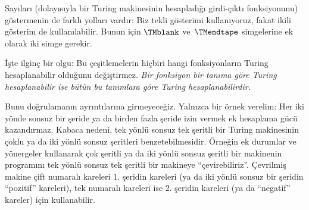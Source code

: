 Sayıları (dolayısıyla bir Turing makinesinin hesapladığı girdi-çıktı
fonksiyonunu) göstermenin de farklı yolları vardır: Biz tekli gösterimi
kullanıyoruz, fakat ikili gösterim de kullanılabilir. Bunun için $\TMblank$
ve~$\TMendtape$ simgelerine ek olarak iki simge gerekir.

İşte ilginç bir olgu: Bu çeşitlemelerin hiçbiri hangi fonksiyonların Turing
hesaplanabilir olduğunu değiştirmez. \emph{Bir fonksiyon bir tanıma göre
Turing hesaplanabilir ise bütün bu tanımlara göre Turing hesaplanabilirdir.}

Bunu doğrulamanın ayrıntılarına girmeyeceğiz. Yalnızca bir örnek verelim:
Her iki yönde sonsuz bir şeride ya da birden fazla şeride izin vermek ek
hesaplama gücü kazandırmaz. Kabaca nedeni, tek yönlü sonsuz tek şeritli bir
Turing makinesinin çoklu ya da iki yönlü sonsuz şeritleri benzetebilmesidir.
Örneğin ek durumlar ve yönergeler kullanarak çok şeritli ya da iki yönlü
sonsuz şeritli bir makinenin programını tek yönlü sonsuz tek şeritli bir
makineye ``çevirebiliriz''. Çevrilmiş makine çift numaralı kareleri $1$.
şeridin kareleri (ya da iki yönlü sonsuz bir şeridin ``pozitif'' kareleri),
tek numaralı kareleri ise $2$. şeridin kareleri (ya da ``negatif'' kareler)
için kullanabilir.

